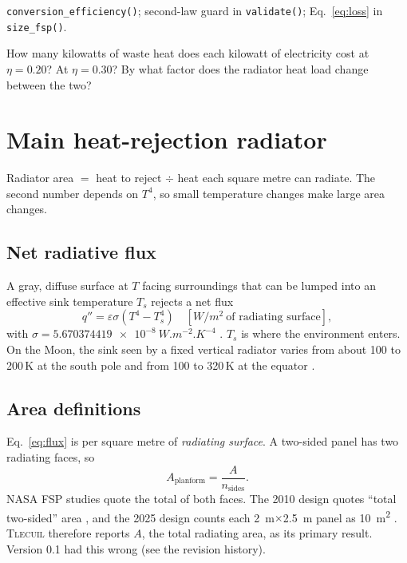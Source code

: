 \documentclass[11pt]{article}
\numberwithin{equation}{section}
\numberwithin{table}{section}
\newcommand{\tlecuil}{\textsc{Tlecuil}}
\begin{document}
\begin{code}
\texttt{conversion\_efficiency()}; second-law guard in \texttt{validate()}; Eq.~\eqref{eq:loss} in \texttt{size\_fsp()}.
\end{code}

\begin{tryit}[label=try:eta]
How many kilowatts of waste heat does each kilowatt of electricity cost at $\eta=0.20$?
At $\eta=0.30$? By what factor does the radiator heat load change between the two?
\end{tryit}

\section{Main heat-rejection radiator}\label{sec:rad}

\begin{keyidea}
Radiator area $=$ heat to reject $\div$ heat each square metre can radiate. The second
number depends on $T^4$, so small temperature changes make large area changes.
\end{keyidea}

\subsection{Net radiative flux}
A gray, diffuse surface at $T$ facing surroundings that can be lumped into an
effective sink temperature $T_s$ rejects a net flux
\cite{howell2021radiation,gilmore2002thermal}
\begin{equation}
  q'' = \varepsilon\sigma\left(T^4 - T_s^4\right)\quad[\si{W/m^2}~\text{of radiating surface}],
  \label{eq:flux}
\end{equation}
with $\sigma = \SI{5.670374419e-8}{W.m^{-2}.K^{-4}}$ \cite{codata2018}. $T_s$ is
where the environment enters. On the Moon, the sink seen by a fixed vertical radiator
varies from about 100 to 200\,K at the south pole and from 100 to 320\,K at the
equator \cite{mason2025trades}.

\subsection{Area definitions}
Eq.~\eqref{eq:flux} is per square metre of \emph{radiating surface}. A two-sided
panel has two radiating faces, so
\begin{equation}
  A_\text{planform} = \frac{A}{n_\text{sides}} .
  \label{eq:planform}
\end{equation}
NASA FSP studies quote the total of both faces. The 2010 design quotes ``total
two-sided'' area \cite{fsp2010icd}, and the 2025 design counts each
\SI{2}{m}$\times$\SI{2.5}{m} panel as \SI{10}{m^2} \cite{mason2025trades}.
\tlecuil{} therefore reports $A$, the total radiating area, as its primary
result. Version 0.1 had this wrong (see the revision history).
\end{document}
